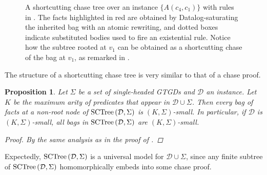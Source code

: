 \documentclass[12pt]{report}
\theoremstyle{plain}
\newtheorem{proposition}[theorem]{Proposition}
\theoremstyle{definition}
\newcommand{\SCTree}[2]{\ensuremath{\normalfont{\textrm{SCTree}} \left( #1, #2 \right)}}
\begin{document}
\begin{figure}[t]
  \centering
  
  \caption{A shortcutting chase tree over an instance $\{ A(c_4, c_1) \}$ with rules in . The facts highlighted in red are obtained by Datalog-saturating the inherited bag with an atomic rewriting, and dotted boxes indicate substituted bodies used to fire an existential rule. Notice how the subtree rooted at $v_1$ can be obtained as a shortcutting chase of the bag at $v_1$, as remarked in .}
  \label{sctree-simple-example-diagram}
\end{figure}

The structure of a shortcutting chase tree is very similar to that of a chase proof.

\begin{proposition}
\label{each-bag-in-sctree-is-k-sigma-small}
  Let $\Sigma$ be a set of single-headed GTGDs and $\mathcal{D}$ an instance. Let $K$ be the maximum arity of predicates that appear in $\mathcal{D} \cup \Sigma$. Then every bag of facts at a non-root node of \emph{$\SCTree{\mathcal{D}}{\Sigma}$} is $(K, \Sigma)$-small. In particular, if $\mathcal{D}$ is $(K, \Sigma)$-small, all bags in $\SCTree{\mathcal{D}}{\Sigma}$ are $(K, \Sigma)$-small.
  \begin{proof}
    By the same analysis as in the proof of .
  \end{proof}
\end{proposition}

Expectedly, $\SCTree{\mathcal{D}}{\Sigma}$ is a universal model for $\mathcal{D} \cup \Sigma$, since any finite subtree of $\SCTree{\mathcal{D}}{\Sigma}$ homomorphically embeds into some chase proof.
\end{document}
